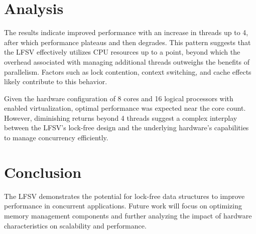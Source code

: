 \documentclass{article}
\begin{document}
\section{Analysis}
The results indicate improved performance with an increase in threads up to 4, after which performance plateaus and then degrades. This pattern suggests that the LFSV effectively utilizes CPU resources up to a point, beyond which the overhead associated with managing additional threads outweighs the benefits of parallelism. Factors such as lock contention, context switching, and cache effects likely contribute to this behavior.

Given the hardware configuration of 8 cores and 16 logical processors with enabled virtualization, optimal performance was expected near the core count. However, diminishing returns beyond 4 threads suggest a complex interplay between the LFSV's lock-free design and the underlying hardware's capabilities to manage concurrency efficiently.

\section{Conclusion}
The LFSV demonstrates the potential for lock-free data structures to improve performance in concurrent applications. Future work will focus on optimizing memory management components and further analyzing the impact of hardware characteristics on scalability and performance.
\end{document}

